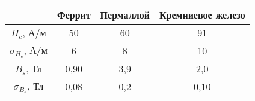 \begin{tabular}{cccc}
\toprule
& Феррит & Пермаллой & Кремниевое железо \\
\midrule
$H_c$, А/м          & 50    & 60    & 91    \\
$\sigma_{H_c}$, А/м & 6     & 8     & 10    \\
$B_s$, Тл           & 0,90  & 3,9   & 2,0   \\
$\sigma_{B_s}$, Тл  & 0,08  & 0,2   & 0,10  \\
\bottomrule
\end{tabular}
